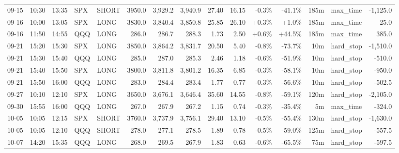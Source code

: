 \documentclass[11pt,a4paper,twoside]{article}
\begin{document}
\begin{landscape}
\begin{center}
\begin{longtable}{>{\color{txtmain}}l l l l l r r r r r r r r >{\color{txtmain}}l r}
09-15 & 10:30 & 13:35 & SPX & SHORT & 3950.0 & 3,929.2 & 3,940.9 & 27.40 & 16.15 & \textcolor{lossred}{-0.3\%} & \textcolor{lossred}{-41.1\%} & 185m & max\_time & \textcolor{lossred}{-1,125.0} \\
09-16 & 10:00 & 13:05 & SPX & LONG & 3830.0 & 3,840.4 & 3,850.8 & 25.85 & 26.10 & \textcolor{wingreen}{+0.3\%} & \textcolor{wingreen}{+1.0\%} & 185m & max\_time & \textcolor{wingreen}{25.0} \\
09-16 & 11:50 & 14:55 & QQQ & LONG & 286.0 & 286.7 & 288.3 & 1.73 & 2.50 & \textcolor{wingreen}{+0.6\%} & \textcolor{wingreen}{+44.5\%} & 185m & max\_time & \textcolor{wingreen}{385.0} \\
09-21 & 15:20 & 15:30 & SPX & LONG & 3850.0 & 3,864.2 & 3,831.7 & 20.50 & 5.40 & \textcolor{lossred}{-0.8\%} & \textcolor{lossred}{-73.7\%} & 10m & hard\_stop & \textcolor{lossred}{-1,510.0} \\
09-21 & 15:30 & 15:40 & QQQ & LONG & 285.0 & 287.0 & 285.3 & 2.46 & 1.18 & \textcolor{lossred}{-0.6\%} & \textcolor{lossred}{-51.9\%} & 10m & hard\_stop & \textcolor{lossred}{-510.0} \\
09-21 & 15:40 & 15:50 & SPX & LONG & 3800.0 & 3,811.8 & 3,801.2 & 16.35 & 6.85 & \textcolor{lossred}{-0.3\%} & \textcolor{lossred}{-58.1\%} & 10m & hard\_stop & \textcolor{lossred}{-950.0} \\
09-21 & 15:50 & 16:00 & QQQ & LONG & 283.0 & 284.4 & 283.4 & 1.77 & 0.77 & \textcolor{lossred}{-0.3\%} & \textcolor{lossred}{-56.6\%} & 10m & hard\_stop & \textcolor{lossred}{-502.5} \\
09-27 & 10:10 & 12:10 & SPX & LONG & 3650.0 & 3,676.1 & 3,646.4 & 35.60 & 14.55 & \textcolor{lossred}{-0.8\%} & \textcolor{lossred}{-59.1\%} & 120m & hard\_stop & \textcolor{lossred}{-2,105.0} \\
09-30 & 15:55 & 16:00 & QQQ & LONG & 267.0 & 267.9 & 267.2 & 1.15 & 0.74 & \textcolor{lossred}{-0.3\%} & \textcolor{lossred}{-35.4\%} & 5m & max\_time & \textcolor{lossred}{-324.0} \\
10-05 & 10:05 & 12:15 & SPX & SHORT & 3760.0 & 3,737.9 & 3,756.1 & 29.40 & 13.10 & \textcolor{lossred}{-0.5\%} & \textcolor{lossred}{-55.4\%} & 130m & hard\_stop & \textcolor{lossred}{-1,630.0} \\
10-05 & 10:05 & 12:10 & QQQ & SHORT & 278.0 & 277.1 & 278.5 & 1.89 & 0.78 & \textcolor{lossred}{-0.5\%} & \textcolor{lossred}{-59.0\%} & 125m & hard\_stop & \textcolor{lossred}{-557.5} \\
10-07 & 14:20 & 15:35 & QQQ & LONG & 268.0 & 269.5 & 267.9 & 1.83 & 0.63 & \textcolor{lossred}{-0.6\%} & \textcolor{lossred}{-65.5\%} & 75m & hard\_stop & \textcolor{lossred}{-597.5} \\

\end{longtable}
\end{center}
\end{landscape}
\end{document}
